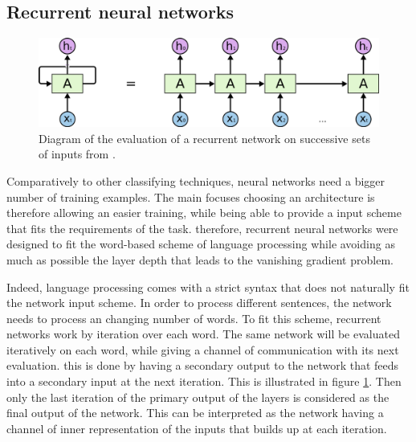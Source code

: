 

\subsection{Recurrent neural networks}

\begin{figure}
    \centering
    \includegraphics[width=\textwidth]{Images/recurrent_network.png}
    \caption{Diagram of the evaluation of a recurrent network on successive sets of inputs from \cite{RNN}.}
    \label{fig:recurrent_network}
\end{figure}

Comparatively to other classifying techniques, neural networks need a bigger number of training examples. The main focuses choosing an architecture is therefore allowing an easier training, while being able to provide a input scheme that fits the requirements of the task. therefore, recurrent neural networks were designed to fit the word-based scheme of language processing while avoiding as much as possible the layer depth that leads to the vanishing gradient problem.

Indeed, language processing comes with a strict syntax that does not naturally fit the network input scheme. In order to process different sentences, the network needs to process an changing number of words. To fit this scheme, recurrent networks work by iteration over each word. The same network will be evaluated iteratively on each word, while giving a channel of communication with its next evaluation. this is done by having a secondary output to the network that feeds into a secondary input at the next iteration. This is illustrated in figure \ref{fig:recurrent_network}. Then only the last iteration of the primary output of the layers is considered as the final output of the network. This can be interpreted as the network having a channel of inner representation of the inputs that builds up at each iteration.

